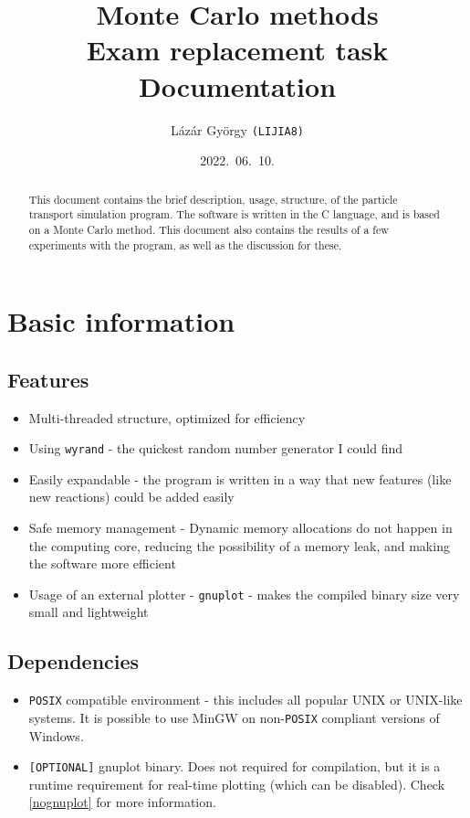 \documentclass[a4paper,12pt]{article}
\title{\bf Monte Carlo methods \\ Exam replacement task \\ Documentation}
\author{ {Lázár György \tt (LIJIA8)}\\
}
\date{2022.\ 06.\ 10.} %
\begin{document}
\maketitle
\begin{abstract}
This document contains the brief description, usage, structure, of the particle transport simulation program. The software is written in the C language, and is based on a Monte Carlo method. This document also contains the results of a few experiments with the program, as well as the discussion for these.
\end{abstract}

\section{Basic information}
\subsection{Features}
\begin{itemize}
\item Multi-threaded structure, optimized for efficiency
\item Using \texttt{wyrand} - the quickest random number generator I could find
\item Easily expandable - the program is written in a way that new features (like new reactions) could be added easily
\item Safe memory management - Dynamic memory allocations do not happen in the computing core, reducing the possibility of a memory leak, and making the software more efficient
\item Usage of an external plotter - \texttt{gnuplot} - makes the compiled binary size very small and lightweight
\end{itemize}

\subsection{Dependencies}
\begin{itemize}
\item \texttt{POSIX} compatible environment - this includes all popular UNIX or UNIX-like systems. It is possible to use MinGW on non-\texttt{POSIX} compliant versions of Windows.
\item \texttt{[OPTIONAL]} gnuplot binary. Does not required for compilation, but it is a runtime requirement for real-time plotting (which can be disabled). Check \ref{nognuplot} for more information.
\end{itemize}
\end{document}
